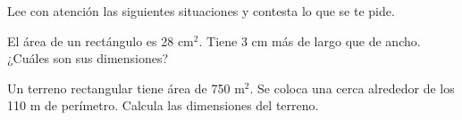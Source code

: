 Lee con atención las siguientes situaciones y contesta lo que se te pide.

\begin{parts}





    El área de un rectángulo es 28 cm$^2$. Tiene 3 cm más de largo que de ancho. ¿Cuáles son sus dimensiones?

    \begin{solutionbox}{9cm}

    \end{solutionbox}

    Un terreno rectangular tiene área de 750 m$^2$. Se coloca una cerca alrededor de los 110 m de perímetro. Calcula las dimensiones del terreno.

    \begin{solutionbox}{9cm}

    \end{solutionbox}



\end{parts}